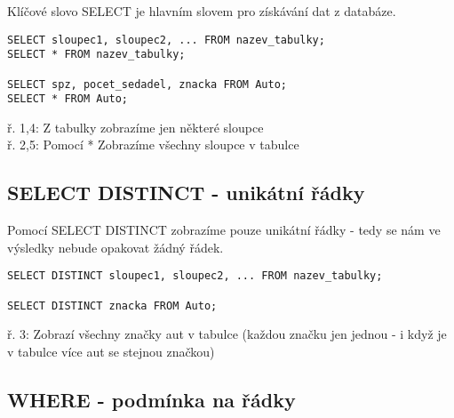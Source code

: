 Klíčové slovo SELECT je hlavním slovem pro získávání dat z databáze.\\
\begin{minipage}[t]{.45\textwidth}
\begin{code}
\begin{verbatim}
SELECT sloupec1, sloupec2, ... FROM nazev_tabulky;
SELECT * FROM nazev_tabulky;

SELECT spz, pocet_sedadel, znacka FROM Auto;
SELECT * FROM Auto;
\end{verbatim}
\label{code:select}
\end{code}
\end{minipage}
\begin{minipage}[t]{.45\textwidth}
\vspace{1.7cm}
ř. 1,4:	Z tabulky zobrazíme jen některé sloupce\\
ř. 2,5:	Pomocí * Zobrazíme všechny sloupce v tabulce 
\end{minipage}

\subsection{SELECT DISTINCT - unikátní řádky}

Pomocí SELECT DISTINCT zobrazíme pouze unikátní řádky - tedy se nám ve výsledky nebude opakovat žádný řádek.\\
\begin{minipage}[t]{.45\textwidth}
\begin{code}
\begin{verbatim}
SELECT DISTINCT sloupec1, sloupec2, ... FROM nazev_tabulky;

SELECT DISTINCT znacka FROM Auto;
\end{verbatim}
\label{code:select_distinct}
\end{code}
\end{minipage}
\begin{minipage}[t]{.45\textwidth}
\vspace{.5cm}
ř. 3: Zobrazí všechny značky aut v tabulce (každou značku jen jednou - i když je v tabulce více aut se stejnou značkou)
\end{minipage}

\subsection{WHERE - podmínka na řádky}

